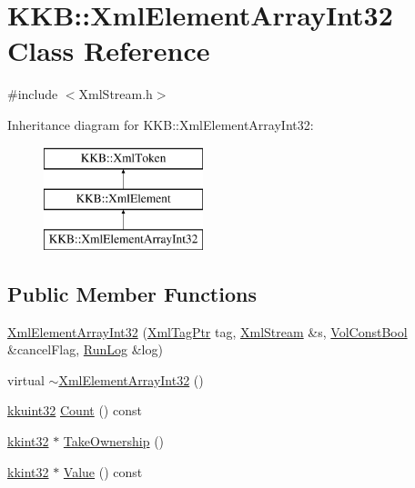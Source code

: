 \hypertarget{class_k_k_b_1_1_xml_element_array_int32}{}\section{K\+KB\+:\+:Xml\+Element\+Array\+Int32 Class Reference}
\label{class_k_k_b_1_1_xml_element_array_int32}


{\ttfamily \#include $<$Xml\+Stream.\+h$>$}

Inheritance diagram for K\+KB\+:\+:Xml\+Element\+Array\+Int32\+:\begin{figure}[H]
\begin{center}
\leavevmode
\includegraphics[height=3.000000cm]{class_k_k_b_1_1_xml_element_array_int32}
\end{center}
\end{figure}
\subsection*{Public Member Functions}
\begin{DoxyCompactItemize}
\item 
\hyperlink{class_k_k_b_1_1_xml_element_array_int32_ada0ab8a45899239adbc4c3a97ed99cab}{Xml\+Element\+Array\+Int32} (\hyperlink{namespace_k_k_b_a9253a3ea8a5da18ca82be4ca2b390ef0}{Xml\+Tag\+Ptr} tag, \hyperlink{class_k_k_b_1_1_xml_stream}{Xml\+Stream} \&s, \hyperlink{namespace_k_k_b_a7d390f568e2831fb76b86b56c87bf92f}{Vol\+Const\+Bool} \&cancel\+Flag, \hyperlink{class_k_k_b_1_1_run_log}{Run\+Log} \&log)
\item 
virtual \hyperlink{class_k_k_b_1_1_xml_element_array_int32_a98c232e8b95446cd2bbdfee819ddebbb}{$\sim$\+Xml\+Element\+Array\+Int32} ()
\item 
\hyperlink{namespace_k_k_b_af8d832f05c54994a1cce25bd5743e19a}{kkuint32} \hyperlink{class_k_k_b_1_1_xml_element_array_int32_a2773cdcb924ac8c67e32a4d07ee15f30}{Count} () const 
\item 
\hyperlink{namespace_k_k_b_a8fa4952cc84fda1de4bec1fbdd8d5b1b}{kkint32} $\ast$ \hyperlink{class_k_k_b_1_1_xml_element_array_int32_a466c9f162ec1ce60a50feb8f2268b86c}{Take\+Ownership} ()
\item 
\hyperlink{namespace_k_k_b_a8fa4952cc84fda1de4bec1fbdd8d5b1b}{kkint32} $\ast$ \hyperlink{class_k_k_b_1_1_xml_element_array_int32_aac523483b2d03bfbc7ca641b27e14189}{Value} () const 
\end{DoxyCompactItemize}
